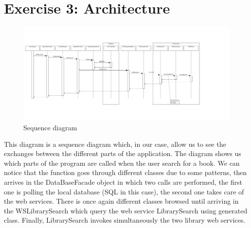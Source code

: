 \documentclass[a4paper,10pt]{article}
\begin{document}
\section{Exercise 3: Architecture}
\clearpage
\begin{landscape}
\begin{figure}[h]
   \includegraphics[scale=0.4]{uml/sequence.png}
   \caption{\label{sequence} Sequence diagram}
\end{figure}
\end{landscape}
This diagram is a sequence diagram which, in our case, allow us to see the exchanges between the different parts of the application. The diagram shows us which parts of the program are called when the user search for a book. We can notice that the function goes through different classes due to some patterns, then arrives in the DataBaseFacade object in which two calls are performed, the first one is polling the local database (SQL in this case), the second one takes care of the web services. There is once again different classes browsed until arriving in the WSLibrarySearch which query the web service LibrarySearch using generated class. Finally, LibrarySearch invokes simultaneously the two library web services.
\end{document}
